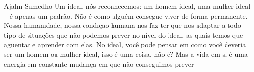 
\cleartoverso

\begin{quotepage}{0.6}{Ajahn Sumedho}
Um ideal, nós reconhecemos: um homem ideal, uma mulher ideal – é apenas
um padrão. Não é como alguém consegue viver de forma permanente. Nossa
humanidade, nossa condição humana nos faz ter que nos adaptar a todo
tipo de situações que não podemos prever no nível do ideal, as quais
temos que aguentar e aprender com elas. No ideal, você pode pensar em
como você deveria ser um homem ou mulher ideal, isso é uma coisa, não
é? Mas a vida em si é uma energia em constante mudança em que não
conseguimos prever 
\end{quotepage}

